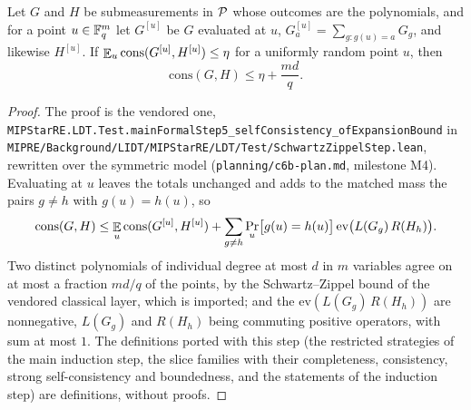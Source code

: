 \begin{lemma}
\label{lem:co-schwartz-zippel-step}
\leanok
Let $G$ and $H$ be submeasurements in $\cal{P}$ whose outcomes are the polynomials, and for a point
$u \in \Fq^m$ let $G^{[u]}$ be $G$ evaluated at $u$, $G^{[u]}_a = \sum_{g : g(u) = a} G_g$, and
likewise $H^{[u]}$. If $\E_u \mathrm{cons}(G^{[u]}, H^{[u]}) \leq \eta$ for a uniformly random
point $u$, then
\[
  \mathrm{cons}(G, H) \leq \eta + \frac{md}{q}.
\]
\end{lemma}

\begin{proof}
\leanok
The proof is the vendored one, \texttt{MIPStarRE.LDT.Test.mainFormalStep5\_selfConsistency\_ofExpansionBound}
in \texttt{MIPRE/Background/LIDT/MIPStarRE/LDT/Test/SchwartzZippelStep.lean}, rewritten over the
symmetric model (\texttt{planning/c6b-plan.md}, milestone M4). Evaluating at $u$ leaves the totals
unchanged and adds to the matched mass the pairs $g \neq h$ with $g(u) = h(u)$, so
\[
  \mathrm{cons}(G, H) \leq \E_u \mathrm{cons}(G^{[u]}, H^{[u]}) + \sum_{g \neq h} \Pr_u\bigl[g(u)
  = h(u)\bigr]\, \mathrm{ev}\bigl(L(G_g)\, R(H_h)\bigr).
\]
Two distinct polynomials of individual degree at most $d$ in $m$ variables agree on at most a
fraction $md/q$ of the points, by the Schwartz--Zippel bound of the vendored classical layer, which
is imported; and the $\mathrm{ev}(L(G_g)\, R(H_h))$ are nonnegative, $L(G_g)$ and $R(H_h)$ being
commuting positive operators, with sum at most $1$. The definitions ported with this step (the
restricted strategies of the main induction step, the slice families with their completeness,
consistency, strong self-consistency and boundedness, and the statements of the induction step)
are definitions, without proofs.
\end{proof}

